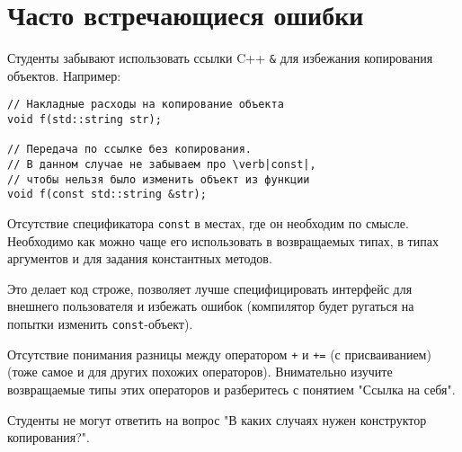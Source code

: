 \documentclass[a4paper,12pt]{article}
\begin{document}
\section{Часто встречающиеся ошибки}

Студенты забывают использовать ссылки C++ \lstinline|&| для избежания
копирования объектов. Например:
\begin{lstlisting}[texcl]
// Накладные расходы на копирование объекта
void f(std::string str);

// Передача по ссылке без копирования.
// В данном случае не забываем про \verb|const|,
// чтобы нельзя было изменить объект из функции
void f(const std::string &str);
\end{lstlisting}

Отсутствие спецификатора \lstinline|const| в местах, где он необходим
по смысле. Необходимо как можно чаще его использовать в возвращаемых
типах, в типах аргументов и для задания константных методов.

Это делает код строже, позволяет лучше специфицировать интерфейс для
внешнего пользователя и избежать ошибок (компилятор будет ругаться на
попытки изменить \lstinline|const|-объект).

Отсутствие понимания разницы между оператором \lstinline|+| и
\lstinline|+=| (с присваиванием) (тоже самое и для других похожих
операторов). Внимательно изучите возвращаемые типы этих операторов и
разберитесь с понятием "Ссылка на себя".

Студенты не могут ответить на вопрос "В каких случаях нужен
конструктор копирования?".
\end{document}
